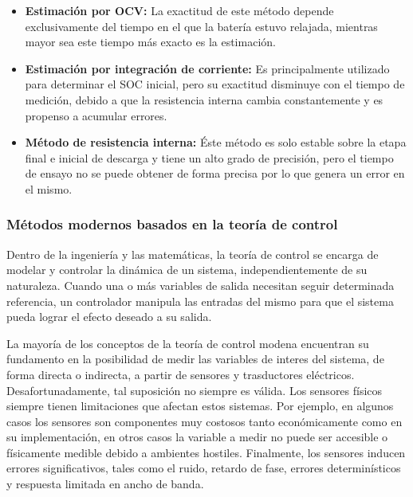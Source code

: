 \documentclass[10pt,a4paper]{article}
\begin{document}
\begin{itemize}
    \item \textbf{Estimaci\'on por OCV:} La exactitud de este m\'etodo depende
        exclusivamente del tiempo en el que la bater\'ia estuvo relajada,
        mientras mayor sea este tiempo m\'as exacto es la estimaci\'on.
    \item \textbf{Estimaci\'on por integraci\'on de corriente:} Es
        principalmente utilizado para determinar el \acrshort{SOC} inicial, pero
        su exactitud disminuye con el tiempo de medici\'on, debido a que la
        resistencia interna cambia constantemente y es propenso a acumular
        errores.
    \item \textbf{M\'etodo de resistencia interna:} \'Este m\'etodo es solo
        estable sobre la etapa final e inicial de descarga y tiene un alto grado 
        de precisi\'on, pero el tiempo de ensayo no se puede obtener de forma
        precisa por lo que genera un error en el mismo.
\end{itemize}


\subsubsection{M\'etodos modernos basados en la teor\'ia de control}
\label{controlTheoryMethod}

\noindent Dentro de la ingenier\'ia y las matem\'aticas, la teor\'ia de control
se encarga de modelar y controlar la din\'amica de un sistema,
independientemente de su naturaleza. Cuando una o m\'as variables de salida
necesitan seguir determinada referencia, un controlador manipula las entradas
del mismo para que el sistema pueda lograr el efecto deseado a su salida.

\noindent La mayor\'ia de los conceptos de la teoría de control modena
encuentran su fundamento en la posibilidad de medir las variables de interes del
sistema, de forma directa o indirecta, a partir de sensores y trasductores
eléctricos. Desafortunadamente, tal suposici\'on no siempre es v\'alida. Los
sensores f\'isicos siempre tienen limitaciones que afectan estos sistemas. Por
ejemplo, en algunos casos los sensores son componentes muy costosos tanto
econ\'omicamente como en su implementaci\'on, en otros casos la variable a medir
no puede ser accesible o f\'isicamente medible debido a ambientes hostiles.
Finalmente, los sensores inducen errores significativos, tales como el ruido,
retardo de fase, errores determin\'isticos y respuesta limitada en ancho de
banda.
\end{document}
